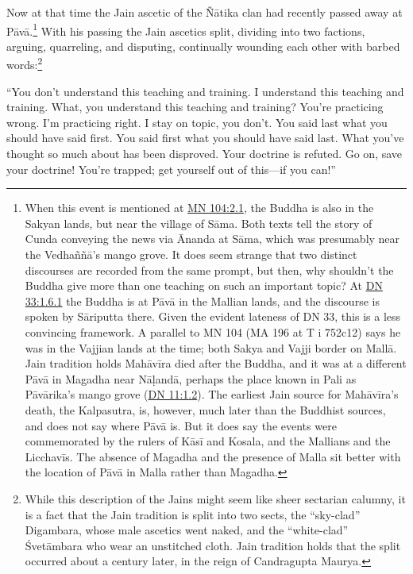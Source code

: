 \documentclass[12pt,openany]{book}%
\begin{document}
Now at that time the Jain ascetic of the \textsanskrit{Ñātika} clan had recently passed away at \textsanskrit{Pāvā}.\footnote{When this event is mentioned at \href{https://suttacentral.net/mn104/en/sujato\#2.1}{MN 104:2.1}, the Buddha is also in the Sakyan lands, but near the village of \textsanskrit{Sāma}. Both texts tell the story of Cunda conveying the news via Ānanda at \textsanskrit{Sāma}, which was presumably near the \textsanskrit{Vedhaññā}’s mango grove. It does seem strange that two distinct discourses are recorded from the same prompt, but then, why shouldn’t the Buddha give more than one teaching on such an important topic? At \href{https://suttacentral.net/dn33/en/sujato\#1.6.1}{DN 33:1.6.1} the Buddha is at \textsanskrit{Pāvā} in the Mallian lands, and the discourse is spoken by \textsanskrit{Sāriputta} there. Given the evident lateness of DN 33, this is a less convincing framework. A parallel to MN 104 (MA 196 at T i 752c12) says he was in the Vajjian lands at the time; both Sakya and Vajji border on \textsanskrit{Mallā}. Jain tradition holds \textsanskrit{Mahāvīra} died after the Buddha, and it was at a different \textsanskrit{Pāvā} in Magadha near \textsanskrit{Nāḷandā}, perhaps the place known in Pali as \textsanskrit{Pāvārika}’s mango grove (\href{https://suttacentral.net/dn11/en/sujato\#1.2}{DN 11:1.2}). The earliest Jain source for \textsanskrit{Mahāvīra}’s death, the Kalpasutra, is, however, much later than the Buddhist sources, and does not say where \textsanskrit{Pāvā} is. But it does say the events were commemorated by the rulers of \textsanskrit{Kāsī} and Kosala, and the Mallians and the \textsanskrit{Licchavīs}. The absence of Magadha and the presence of Malla sit better with the location of \textsanskrit{Pāvā} in Malla rather than Magadha. } With his passing the Jain ascetics split, dividing into two factions, arguing, quarreling, and disputing, continually wounding each other with barbed words:\footnote{While this description of the Jains might seem like sheer sectarian calumny, it is a fact that the Jain tradition is split into two sects, the “sky-clad” Digambara, whose male ascetics went naked, and the “white-clad” \textsanskrit{Śvetāmbara} who wear an unstitched cloth. Jain tradition holds that the split occurred about a century later, in the reign of Candragupta Maurya. } 

“You don’t understand this teaching and training. I understand this teaching and training. What, you understand this teaching and training? You’re practicing wrong. I’m practicing right. I stay on topic, you don’t. You said last what you should have said first. You said first what you should have said last. What you’ve thought so much about has been disproved. Your doctrine is refuted. Go on, save your doctrine! You’re trapped; get yourself out of this—if you can!” 
\end{document}
